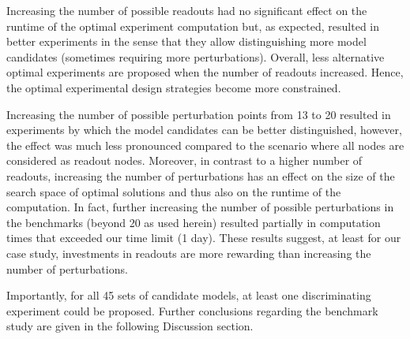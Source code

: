 Increasing the number of possible readouts had no significant effect on the runtime
of the optimal experiment computation but, as expected,
resulted in better experiments in the sense that they allow distinguishing more model candidates
(sometimes requiring more perturbations).
Overall, less alternative optimal experiments are proposed when the number of readouts increased.
Hence, the optimal experimental design strategies become more constrained.

Increasing the number of possible perturbation points from 13 to 20 resulted
in experiments by which the model candidates can be better distinguished,
however, the effect was much less pronounced compared to the scenario
where all nodes are considered as readout nodes.
Moreover, in contrast to a higher number of readouts, increasing the number of perturbations has an effect
on the size of the search space of optimal solutions and thus also on the runtime of the computation.
In fact, further increasing the number of possible perturbations in the benchmarks (beyond 20 as used herein)
resulted partially in computation times that exceeded our time limit (1 day).
These results suggest, at least for our case study,
investments in readouts are more rewarding than increasing the number of perturbations.

Importantly, for all 45 sets of candidate models, at least one discriminating experiment could be proposed.
Further conclusions regarding the benchmark study are given in the following Discussion section.





